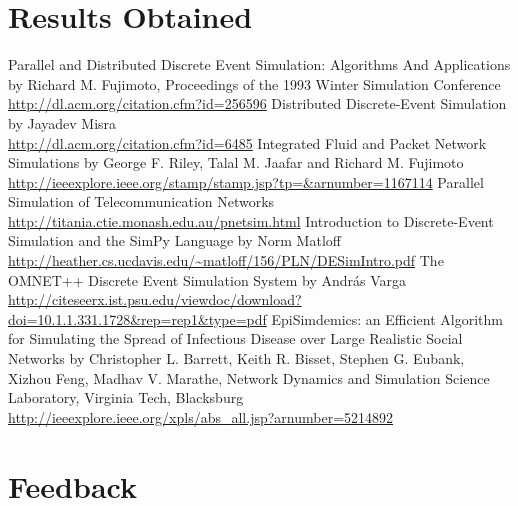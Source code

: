\documentclass[12pt,a4paper]{article}
\begin{document}
\section{Results Obtained}

\begin{thebibliography}{99}
Parallel and Distributed Discrete Event Simulation: Algorithms And Applications by Richard M. Fujimoto, Proceedings of the 1993 Winter Simulation Conference
\\ \url{http://dl.acm.org/citation.cfm?id=256596}
Distributed Discrete-Event Simulation by Jayadev Misra
\\ \url{http://dl.acm.org/citation.cfm?id=6485}
Integrated Fluid and Packet Network Simulations by George F. Riley, Talal M. Jaafar and Richard M. Fujimoto
\\ \url{http://ieeexplore.ieee.org/stamp/stamp.jsp?tp=&arnumber=1167114}
Parallel Simulation of Telecommunication Networks \url{http://titania.ctie.monash.edu.au/pnetsim.html}
Introduction to Discrete-Event Simulation and the SimPy Language by Norm Matloff
\\ \url{http://heather.cs.ucdavis.edu/~matloff/156/PLN/DESimIntro.pdf}
The OMNET++ Discrete Event Simulation System by András Varga
\\ \url{http://citeseerx.ist.psu.edu/viewdoc/download?doi=10.1.1.331.1728&rep=rep1&type=pdf}
EpiSimdemics: an Efficient Algorithm for Simulating the Spread of Infectious Disease over Large Realistic Social Networks by Christopher L. Barrett, Keith R. Bisset, Stephen G. Eubank, Xizhou Feng, Madhav V. Marathe, Network Dynamics and Simulation Science Laboratory, Virginia Tech, Blacksburg
\\ \url{http://ieeexplore.ieee.org/xpls/abs_all.jsp?arnumber=5214892}
\end{thebibliography}

\section{Feedback}
\end{document}
